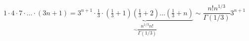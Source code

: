 \begin{example}
    $1\cdot 4 \cdot 7 \cdot \ldots \cdot (3n+1) = 3^{n+1} \cdot \underbrace{ \frac{1}{3}\cdot \left(\frac{1}{3} + 1 \right) \left(\frac{1}{3} + 2 \right) \ldots \left(\frac{1}{3} + n \right)}_{\sim \dfrac{n^{1/3}n!}{\Gamma(1/3)}} \sim \dfrac{n! n^{1/3}}{\Gamma(1/3)}3^{n+1}$
\end{example}

